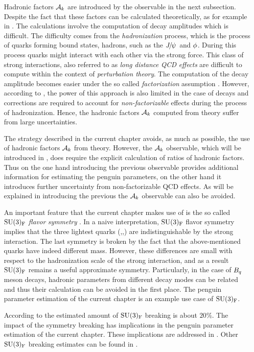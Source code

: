 Hadronic factors $\mathcal{A}_{k}$ are introduced by the observable  in the next
subsection. Despite the fact that these factors can be calculated theoretically, as for example
in \cite{DeBruyn-thesis}. The calculations involve the computation of \BJpsiX decay amplitudes
which is difficult. The difficulty comes from the {\it hadronization} process, which is the
process of quarks forming bound states, hadrons, such as the ${J\mskip -3mu/\mskip -2mu\psi\mskip 2mu}$ and $\phi$.
During this process quarks might interact with each other via the strong force.
This class of strong interactions, also referred to as {\it long distance QCD effects}
are difficult to compute within the context of {\it perturbation theory}.
The computation of the \BJpsiX decay amplitude becomes easier under the so called
{\it factorization} assumption \cite{HAAN1970448,Wirbel1985,CABIBBO1978418,FAKIROV1978315}.
However, according to \cite{DeBruyn-thesis},
the power of this approach is also limited in the case of \BJpsiX decays and corrections
are required to account for {\it non-factorizable} effects during the process of hadronization.
Hence, the hadronic factors $\mathcal{A}_{k}$ computed from theory suffer from large uncertainties.

The strategy described in the current chapter avoids, as much as possible, the use of hadronic
factors $\mathcal{A}_{k}$ from theory. However, the $\mathcal{A}_{k}$ observable, which will be introduced
in , does require the explicit calculation of ratios of hadronic factors. Thus on the one hand
introducing the previous observable provides additional information for estimating the penguin
parameters, on the other hand it introduces further uncertainty from non-factorizable QCD effects.
As will be explained in  introducing the previous the $\mathcal{A}_{k}$
observable can also be avoided.

An important feature that the current chapter makes use of is the so called
$\mathrm{SU}(3)_{\rm F}$ {\it flavor symmetry} \cite{GELLMANN1964214,NEEMAN1961222}.
In a naive interpretation, $\mathrm{SU}(3)_{\rm F}$ flavor symmetry implies that the three lightest quarks (\uquark,\dquark,\squark)
are indistinguishable by the strong interaction. The last symmetry is broken by the fact that the above-mentioned
quarks have indeed different mass. However, these differences are small with respect
to the hadronization scale \lqcd of the strong interaction, and as a result $\mathrm{SU}(3)_{\rm F}$
remains a useful approximate symmetry. Particularly, in the case of $B_q$ meson decays, hadronic
parameters from different decay modes can be related and thus their calculation can be avoided
in the first place. The penguin parameter estimation of the current chapter is an example use
case of $\mathrm{SU}(3)_{\rm F}$.

According to \cite{Nagashima:2007qn,Gronau:2013mda} the estimated amount of $\mathrm{SU}(3)_{\rm F}$ breaking is about $20\%$.
The impact of the symmetry breaking has implications in the penguin parameter estimation
of the current chapter. These implications are addressed in .
Other $\mathrm{SU}(3)_{\rm F}$ breaking estimates can be found in \cite{Charles:2015gya,PDG}.

